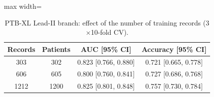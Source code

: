 \begin{table}[!t]
\centering
\scriptsize
\caption{PTB-XL Lead-II branch: effect of the number of training records (3$\times$10-fold CV).}
\label{tab:e10size}
\setlength{\tabcolsep}{3pt}
\begin{adjustbox}{max width=\linewidth}
\begin{tabular}{cccc}
\toprule
Records & Patients & AUC [95\% CI] & Accuracy [95\% CI] \\
\midrule
303 & 302 & 0.823 [0.766, 0.880] & 0.721 [0.665, 0.778] \\
606 & 605 & 0.800 [0.760, 0.841] & 0.727 [0.686, 0.768] \\
1212 & 1200 & 0.825 [0.801, 0.848] & 0.757 [0.730, 0.784] \\
\bottomrule
\end{tabular}
\end{adjustbox}
\end{table}

